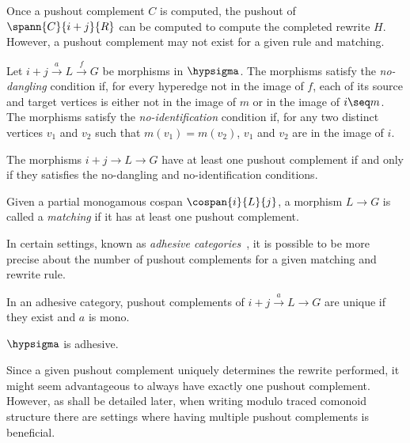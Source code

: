 Once a pushout complement \(C\) is computed, the pushout of
\(\spann{C}{i+j}{R}\) can be computed to compute the completed rewrite \(H\).
However, a pushout complement may not exist for a given rule and matching.

\begin{definition}
    Let \(i + j \xrightarrow{a} L \xrightarrow{f} G\) be morphisms in
    \(\hypsigma\).
    The morphisms satisfy the \emph{no-dangling} condition if, for every
    hyperedge not in the image of \(f\), each of its source and target vertices
    is either not in the image of \(m\) or in the image of \(i \seq m\).
    The morphisms satisfy the \emph{no-identification} condition if, for any two
    distinct vertices \(v_1\) and \(v_2\) such that \(m(v_1) = m(v_2)\), \(v_1\)
    and \(v_2\) are in the image of \(i\).
\end{definition}

\begin{proposition}
    \label{prop:pushout-complement}
    The morphisms \(i + j \to L \to G\) have at least one pushout complement if
    and only if they satisfies the no-dangling and no-identification conditions.
\end{proposition}

\begin{definition}
    Given a partial monogamous cospan \(\cospan{i}{L}{j}\), a morphism
    \(L \to G\) is called a \emph{matching} if it has at least one pushout
    complement.
\end{definition}

In certain settings, known as
\emph{adhesive categories}~\cite{lack2004adhesive}, it is possible to be more
precise about the number of pushout complements for a given matching and rewrite
rule.

\begin{proposition}
    In an adhesive category, pushout complements of \(
        i + j \xrightarrow{a} L \to G\)
    are unique if they exist and \(a\) is mono.
\end{proposition}

\begin{proposition}
    \(\hypsigma\) is adhesive.
\end{proposition}

Since a given pushout complement uniquely determines the rewrite performed, it
might seem advantageous to always have exactly one pushout complement.
However, as shall be detailed later, when writing modulo traced comonoid
structure there are settings where having multiple pushout complements is
beneficial.

